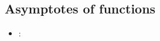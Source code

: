 \begin{itemize}
  \subsection{Asymptotes of functions}
  \begin{itemize}
    \item  {}:  
  \end{itemize}

\end{itemize}







